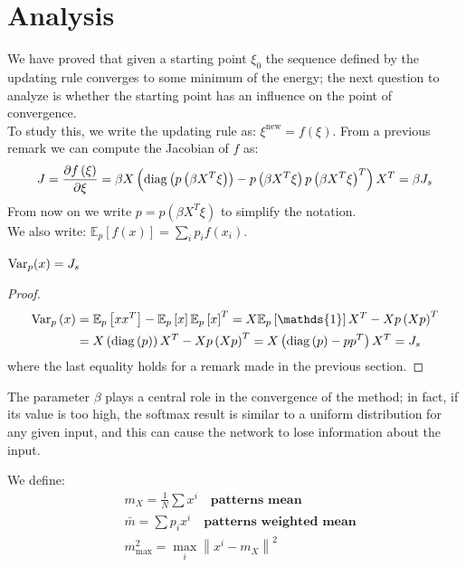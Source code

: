 \section{Analysis}
We have proved that given a starting point $\xi_0$ the sequence defined by the updating rule converges to some minimum of the energy; the next question to analyze is whether the starting point has an influence on the point of convergence.\\
To study this, we write the updating rule as:
$\xi^{\text{new}} = f(\xi)$. From a previous remark we can compute the Jacobian of $f$ as:
\[
J = \frac{\partial f\left(\xi\right)}{\partial \xi} = \beta X \left(\operatorname{diag}\left(p\left(\beta X^T \xi\right)\right) - p\left(\beta X^T \xi\right)p\left(\beta X^T \xi\right)^T \right)X^T = \beta J_s
\]
From now on we write $p = p(\beta X^T \xi)$ to simplify the notation. \\
We also write: $\mathbb{E}_p\left[f(x)\right] = \sum_i p_i f(x_i)$.
\begin{lemma}
    $\textnormal{Var}_p(x) = J_s$
    \begin{proof}
        \begin{align*}
            \text{Var}_p\left(x\right) &= \mathbb{E}_p\left[xx^T\right] - \mathbb{E}_p\left[x\right] \mathbb{E}_p\left[x\right]^T = X \mathbb{E}_p\left[\mathds{1}\right]X^T - Xp \left(Xp\right)^T \\
            &= X\left(\diagonal\left(p\right)\right)X^T -  Xp \left(Xp\right)^T =
            X\left(\diagonal\left(p\right) - p p^T\right) X^T = J_s
        \end{align*}
        where the last equality holds for a remark made in the previous section.
    \end{proof}
\end{lemma}
The parameter $\beta$ plays a central role in the convergence of the method; in fact, if its value is too high, the softmax result is similar to a uniform distribution for any given input, and this can cause the network to lose information about the input.
\begin{definition}
    We define:
    \begin{align*}
        &m_X = \frac1N \sum x^i \quad \textbf{patterns mean} \\
        &\bar{m} = \sum p_i x^i \quad \textbf{patterns weighted mean} \\
        &m^2_{\max} = \max_i \left\|x^i - m_X\right\|^2
    \end{align*}
\end{definition}
